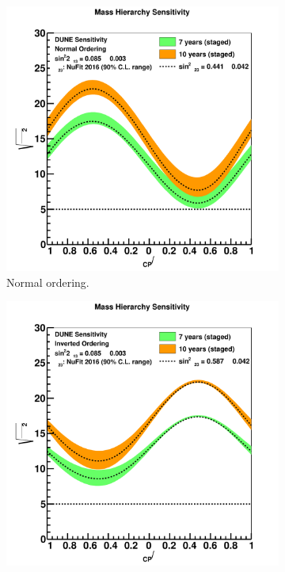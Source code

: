 \begin{figure}
  \centering
  \begin{subfigure}{0.49\textwidth}
    \centering
    \includegraphics[width=\textwidth]{mh_two_exps_th23band_no_2017}
    \caption{Normal ordering.}
  \end{subfigure}%
  \begin{subfigure}{0.49\textwidth}
    \centering
    \includegraphics[width=\textwidth]{mh_two_exps_th23band_io_2017}

\end{subfigure}
\end{figure}
